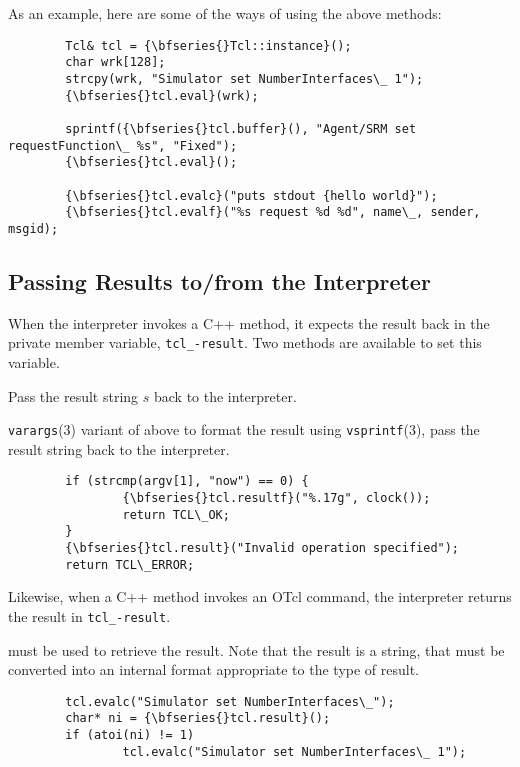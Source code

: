 As an example, here are some of the ways of using the above methods:
\begin{verbatim}
        Tcl& tcl = {\bfseries{}Tcl::instance}();
        char wrk[128];
        strcpy(wrk, "Simulator set NumberInterfaces\_ 1");
        {\bfseries{}tcl.eval}(wrk);

        sprintf({\bfseries{}tcl.buffer}(), "Agent/SRM set requestFunction\_ %s", "Fixed");
        {\bfseries{}tcl.eval}();

        {\bfseries{}tcl.evalc}("puts stdout {hello world}");
        {\bfseries{}tcl.evalf}("%s request %d %d", name\_, sender, msgid);
\end{verbatim}

\subsection{Passing Results to/from the Interpreter}
\label{sec:Result}

When the interpreter invokes a C++ method,
it expects the result back in the private member variable,
{\tt tcl\_-\>result}.
Two methods are available to set this variable.
\begin{list}{\textbullet}{}
\item {}

        Pass the result string $s$ back to the interpreter.
\item

        {\tt varargs}(3) variant of above
        to format the result using {\tt vsprintf}(3),
        pass the result string back to the interpreter.
\end{list}
\begin{verbatim}
        if (strcmp(argv[1], "now") == 0) {
                {\bfseries{}tcl.resultf}("%.17g", clock());
                return TCL\_OK;
        }
        {\bfseries{}tcl.result}("Invalid operation specified");
        return TCL\_ERROR;
\end{verbatim}

Likewise, when a C++ method invokes an OTcl command,
the interpreter returns the result in {\tt tcl\_-\>result}.
\begin{list}{\textbullet}{}
\item {}
      must be used to retrieve the result.
      Note that the result is a string, that must be converted
      into an internal format appropriate to the type of result.
\end{list}
\begin{verbatim}
        tcl.evalc("Simulator set NumberInterfaces\_");
        char* ni = {\bfseries{}tcl.result}();
        if (atoi(ni) != 1)
                tcl.evalc("Simulator set NumberInterfaces\_ 1");
\end{verbatim}
        
